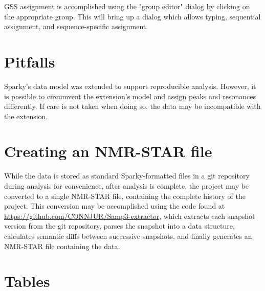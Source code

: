 GSS assignment is accomplished using the "group editor" dialog by clicking on
the appropriate group.  This will bring up a dialog which allows typing,
sequential assignment, and sequence-specific assignment.



\section{Pitfalls}
Sparky's data model was extended to support reproducible analysis.
However, it is possible to circumvent the extension's model and assign peaks
and resonances differently. If care is not taken when doing so, the data
may be incompatible with the extension.

\section{Creating an NMR-STAR file}
While the data is stored as standard Sparky-formatted files in a git repository
during analysis for convenience, after analysis is complete, the project
may be converted to a single NMR-STAR file, containing the complete history
of the project.  This conversion may be accomplished using the code found at
\url{https://github.com/CONNJUR/Samp3-extractor}, which extracts each snapshot 
version from the git repository, parses the snapshot into a data structure,
calculates semantic diffs between successive snapshots, 
and finally generates an NMR-STAR file containing the data.

 

\clearpage
\section{Tables}


